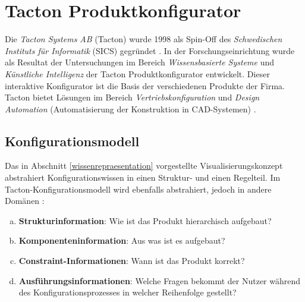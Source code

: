 \documentclass[11pt, a4paper, titlepage, listof=totoc, bibliography=totoc, index=totoc, twoside, openright, headings=normal]{scrreprt}
\begin{document}
\section{Tacton Produktkonfigurator}

Die \emph{Tacton Systems AB} (Tacton) wurde 1998 als Spin-Off des \emph{Schwedischen Instituts für Informatik} (SICS) gegründet \citep{tactonProductOverview}. In der Forschungseinrichtung wurde als Resultat der Untersuchungen im Bereich \emph{Wissensbasierte Systeme} und \emph{Künstliche Intelligenz} der Tacton Produktkonfigurator entwickelt. Dieser interaktive Konfigurator ist die Basis der verschiedenen Produkte der Firma. Tacton bietet Lösungen im Bereich \emph{Vertriebskonfiguration} und \emph{Design Automation} (Automatisierung der Konstruktion in CAD-Systemen) \citep{tactonAbout}.

\subsection{Konfigurationsmodell}
\label{tactonKonfigurationsmodell}
Das in Abschnitt \ref{wissenrepraesentation} vorgestellte Visualisierungskonzept abstrahiert Konfigurationswissen in einen Struktur- und einen Regelteil. Im Tacton-Konfigurationsmodell wird ebenfalls abstrahiert, jedoch in andere Domänen \citep{tactonModeling}:

\begin{enumerate}[(a)]
\item \label{strukturinformation} \textbf{Strukturinformation}: Wie ist das Produkt hierarchisch aufgebaut?
\item \label{komponenteninformation} \textbf{Komponenteninformation}: Aus was ist es aufgebaut?
\item \label{constraintinformationen} \textbf{Constraint-Informationen}: Wann ist das Produkt korrekt?
\item \label{ausfuehrungsinformationen} \textbf{Ausführungsinformationen}: Welche Fragen bekommt der Nutzer während des Konfigurationsprozesses in welcher Reihenfolge gestellt?
\end{enumerate}
\end{document}
